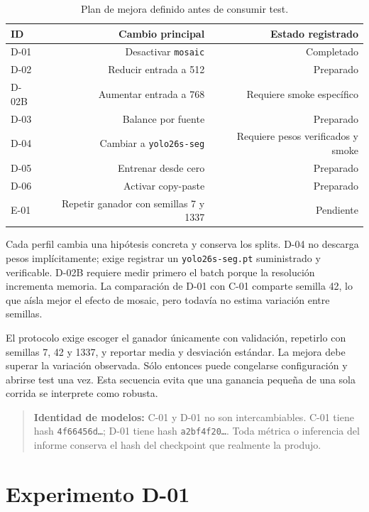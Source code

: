 \documentclass[11pt,a4paper]{article}
\begin{document}
\begin{table}[H]
\centering
\caption{Plan de mejora definido antes de consumir test.}
\small
\begin{tabular}{lrr}
\toprule
ID & Cambio principal & Estado registrado \\
\midrule
D-01 & Desactivar \texttt{mosaic} & Completado \\
D-02 & Reducir entrada a 512 & Preparado \\
D-02B & Aumentar entrada a 768 & Requiere smoke específico \\
D-03 & Balance por fuente & Preparado \\
D-04 & Cambiar a \texttt{yolo26s-seg} & Requiere pesos verificados y smoke \\
D-05 & Entrenar desde cero & Preparado \\
D-06 & Activar copy-paste & Preparado \\
E-01 & Repetir ganador con semillas 7 y 1337 & Pendiente \\
\bottomrule
\end{tabular}
\end{table}

Cada perfil cambia una hipótesis concreta y conserva los splits. D-04 no descarga pesos implícitamente; exige registrar un \texttt{yolo26s-seg.pt} suministrado y verificable. D-02B requiere medir primero el batch porque la resolución incrementa memoria. La comparación de D-01 con C-01 comparte semilla 42, lo que aísla mejor el efecto de mosaic, pero todavía no estima variación entre semillas.


El protocolo exige escoger el ganador únicamente con validación, repetirlo con semillas 7, 42 y 1337, y reportar media y desviación estándar. La mejora debe superar la variación observada. Sólo entonces puede congelarse configuración y abrirse test una vez. Esta secuencia evita que una ganancia pequeña de una sola corrida se interprete como robusta.


\begin{quote}\textbf{Identidad de modelos:} C-01 y D-01 no son intercambiables. C-01 tiene hash \texttt{4f66456d…}; D-01 tiene hash \texttt{a2bf4f20…}. Toda métrica o inferencia del informe conserva el hash del checkpoint que realmente la produjo.\end{quote}

\section{Experimento D-01}
\end{document}
